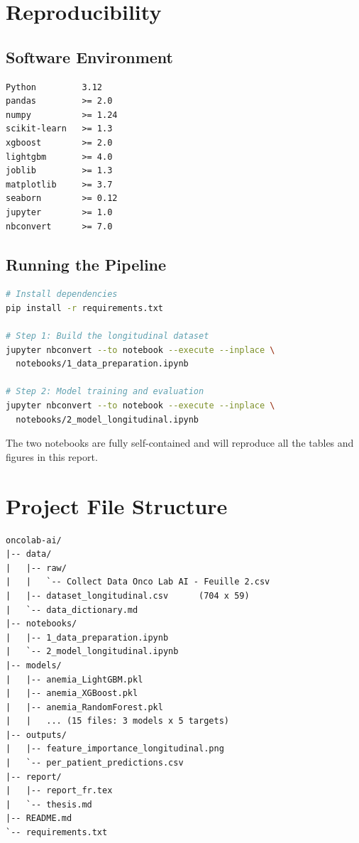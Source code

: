\documentclass[12pt,a4paper]{report}
\begin{document}
\chapter{Reproducibility}
\label{app:repro}

\section{Software Environment}

\begin{lstlisting}
Python         3.12
pandas         >= 2.0
numpy          >= 1.24
scikit-learn   >= 1.3
xgboost        >= 2.0
lightgbm       >= 4.0
joblib         >= 1.3
matplotlib     >= 3.7
seaborn        >= 0.12
jupyter        >= 1.0
nbconvert      >= 7.0
\end{lstlisting}

\section{Running the Pipeline}

\begin{lstlisting}[language=bash]
# Install dependencies
pip install -r requirements.txt

# Step 1: Build the longitudinal dataset
jupyter nbconvert --to notebook --execute --inplace \
  notebooks/1_data_preparation.ipynb

# Step 2: Model training and evaluation
jupyter nbconvert --to notebook --execute --inplace \
  notebooks/2_model_longitudinal.ipynb
\end{lstlisting}

The two notebooks are fully self-contained and will reproduce all the tables and figures in this report.

\chapter{Project File Structure}
\label{app:files}

\begin{lstlisting}
oncolab-ai/
|-- data/
|   |-- raw/
|   |   `-- Collect Data Onco Lab AI - Feuille 2.csv
|   |-- dataset_longitudinal.csv      (704 x 59)
|   `-- data_dictionary.md
|-- notebooks/
|   |-- 1_data_preparation.ipynb
|   `-- 2_model_longitudinal.ipynb
|-- models/
|   |-- anemia_LightGBM.pkl
|   |-- anemia_XGBoost.pkl
|   |-- anemia_RandomForest.pkl
|   |   ... (15 files: 3 models x 5 targets)
|-- outputs/
|   |-- feature_importance_longitudinal.png
|   `-- per_patient_predictions.csv
|-- report/
|   |-- report_fr.tex
|   `-- thesis.md
|-- README.md
`-- requirements.txt
\end{lstlisting}
\end{document}
